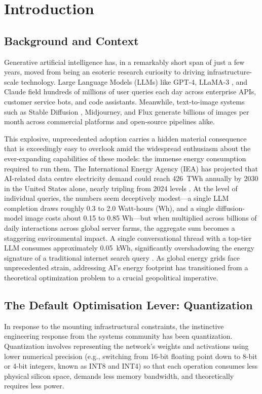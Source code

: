 \documentclass[12pt, a4paper]{report}
\begin{document}
\chapter{Introduction}
\label{ch:intro}

\section{Background and Context}
Generative artificial intelligence has, in a remarkably short span of just a few years, moved from being an esoteric research curiosity to driving infrastructure-scale technology. Large Language Models (LLMs) like GPT-4, LLaMA-3 \cite{grattafiori2024llama3}, and Claude field hundreds of millions of user queries each day across enterprise APIs, customer service bots, and code assistants. Meanwhile, text-to-image systems such as Stable Diffusion \cite{rombach2022ldm}, Midjourney, and Flux \cite{bfl2024flux} generate billions of images per month across commercial platforms and open-source pipelines alike. 

This explosive, unprecedented adoption carries a hidden material consequence that is exceedingly easy to overlook amid the widespread enthusiasm about the ever-expanding capabilities of these models: the immense energy consumption required to run them. The International Energy Agency (IEA) has projected that AI-related data centre electricity demand could reach 426~TWh annually by 2030 in the United States alone, nearly tripling from 2024 levels \cite{iea2024electricity}. At the level of individual queries, the numbers seem deceptively modest---a single LLM completion draws roughly 0.3 to 2.0 Watt-hours (Wh), and a single diffusion-model image costs about 0.15 to 0.85 Wh---but when multiplied across billions of daily interactions across global server farms, the aggregate sum becomes a staggering environmental impact. A single conversational thread with a top-tier LLM consumes approximately 0.05~kWh, significantly overshadowing the energy signature of a traditional internet search query \cite{weissenbacher2025energy}. As global energy grids face unprecedented strain, addressing AI's energy footprint has transitioned from a theoretical optimization problem to a crucial geopolitical imperative.

\section{The Default Optimisation Lever: Quantization}
In response to the mounting infrastructural constraints, the instinctive engineering response from the systems community has been quantization. Quantization involves representing the network's weights and activations using lower numerical precision (e.g., switching from 16-bit floating point down to 8-bit or 4-bit integers, known as INT8 and INT4) so that each operation consumes less physical silicon space, demands less memory bandwidth, and theoretically requires less power. 
\end{document}
